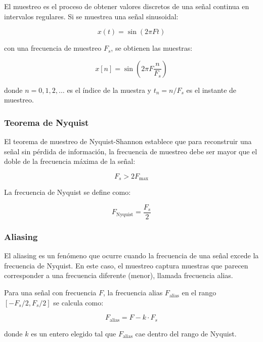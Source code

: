 \documentclass[12pt]{article}
\begin{document}
El muestreo es el proceso de obtener valores discretos de una señal continua en intervalos regulares. Si se muestrea una señal sinusoidal:
 
\begin{equation}
x(t) = \sin(2\pi F t)
\end{equation}
 
con una frecuencia de muestreo $F_s$, se obtienen las muestras:
 
\begin{equation}
x[n] = \sin\left(2\pi F \frac{n}{F_s}\right)
\end{equation}
 
donde $n = 0, 1, 2, \ldots$ es el índice de la muestra y $t_n = n/F_s$ es el instante de muestreo.
 
\subsubsection*{Teorema de Nyquist}
 
El teorema de muestreo de Nyquist-Shannon establece que para reconstruir una señal sin pérdida de información, la frecuencia de muestreo debe ser mayor que el doble de la frecuencia máxima de la señal:
 
\begin{equation}
F_s > 2 F_{\max}
\end{equation}
 
La frecuencia de Nyquist se define como:
 
\begin{equation}
F_{\text{Nyquist}} = \frac{F_s}{2}
\end{equation}
 
\subsubsection*{Aliasing}
 
El aliasing es un fenómeno que ocurre cuando la frecuencia de una señal excede la frecuencia de Nyquist. En este caso, el muestreo captura muestras que parecen corresponder a una frecuencia diferente (menor), llamada frecuencia alias.
 
Para una señal con frecuencia $F$, la frecuencia alias $F_{\text{alias}}$ en el rango $[-F_s/2, F_s/2]$ se calcula como:
 
\begin{equation}
F_{\text{alias}} = F - k \cdot F_s
\end{equation}
 
donde $k$ es un entero elegido tal que $F_{\text{alias}}$ cae dentro del rango de Nyquist.
 
\end{document}
